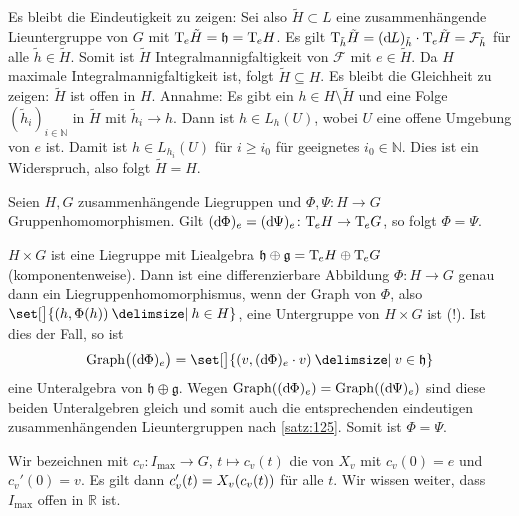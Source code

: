 \begin{beweis}
	Es bleibt die Eindeutigkeit zu zeigen: 
	Sei also $\tilde{H} \subset L$ eine zusammenhängende Lieuntergruppe von $G$ mit $\mathrm{T}\mkern-0.85mu_e \tilde{H} = \mathfrak{h} = \mathrm{T}\mkern-0.85mu_e H$.
	Es gilt $\mathrm{T}\mkern-0.85mu_{\tilde{h}} \tilde{H} = (\mathrm{d}\mkern-1.0mu L)_{\tilde{h}} \cdot \mathrm{T}\mkern-0.85mu_e \tilde{H}= \mathcal{F}_{\tilde{h}}$ für alle $\tilde{h} \in \tilde{H}$.
	Somit ist $\tilde{H}$ Integralmannigfaltigkeit von $\mathcal{F}$ mit $e \in \tilde{H}$.
	Da $H$ maximale Integralmannigfaltigkeit ist, folgt $\tilde{H} \subseteq H$.
	Es bleibt die Gleichheit zu zeigen:
	$\tilde{H}$ ist offen in $H$.
	Annahme: Es gibt ein $h \in H \setminus \tilde{H}$ und eine Folge $(\tilde{h}_i)_{i \in \mathbb{N}}$ in $\tilde{H}$ mit $\tilde{h}_i \to h$.
	Dann ist $h \in L_h(U)$, wobei $U$ eine offene Umgebung von $e$ ist.
	Damit ist $h \in L_{h_i}(U)$ für $i \ge i_0$ für geeignetes $i_0 \in \mathbb{N}$.
	Dies ist ein Widerspruch, also folgt $\tilde{H}=H$.
\end{beweis}

\begin{korollar}[label=kor:126,{name=[gleiche induzierte Liealgebrenhom. implizieren Gleichheit der Liegruppenhom.]}]
	Seien $H,G$ zusammenhängende Liegruppen und $\Phi, \Psi \colon H \to G$ Gruppenhomomorphismen.
	Gilt $(\mathrm{d}\mkern-1.0mu \Phi)_e = (\mathrm{d}\mkern-1.0mu \Psi)_e \colon \mathrm{T}\mkern-0.85mu_e H \to \mathrm{T}\mkern-0.85mu_e G$, so folgt $\Phi = \Psi$.
\end{korollar}
\begin{beweis}
	$H \times G$ ist eine Liegruppe mit Liealgebra $\mathfrak{h} \oplus \mathfrak{g}= \mathrm{T}\mkern-0.85mu_e H \oplus \mathrm{T}\mkern-0.85mu_e G$ (komponentenweise).
	Dann ist eine differenzierbare Abbildung $\Phi \colon H \to G$ genau dann ein Liegruppenhomomorphismus, wenn der Graph von $\Phi$, also $\set[\big]{(h,\Phi(h)) \given h \in H}$, eine Untergruppe von $H \times G $ ist (!).
	Ist dies der Fall, so ist 
	\[
		\Graph \enbrace[\big]{(\mathd \Phi)_e} = \set[\big]{ \enbrace*{v, (\mathd \Phi)_e \cdot v} \given v \in \mathfrak{h}}
	\]
	eine Unteralgebra von $\mathfrak{h} \oplus \mathfrak{g}$.
	Wegen $\Graph \enbrace*{(\mathd \Phi)_e} = \Graph \enbrace*{(\mathd \Psi)_e}$ sind diese beiden Unteralgebren gleich und somit auch die entsprechenden eindeutigen zusammenhängenden Lieuntergruppen nach \autoref{satz:125}.
	Somit ist $\Phi =\Psi$.
\end{beweis}

Wir bezeichnen mit $c_v \colon I_{\max} \to G$, $t \mapsto c_v(t)$ die  von $X_v$ mit $c_v(0)=e$ und $c_v'(0)=v$.
Es gilt dann $c_v'(t) = X_v \enbrace*{c_v(t)}$ für alle $t$.
Wir wissen weiter, dass $I_{\max}$ offen in $\mathbb{R}$ ist.

